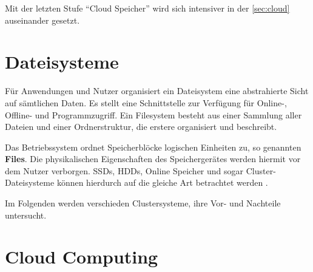 Mit der letzten Stufe ``Cloud Speicher'' wird sich intensiver in der \autoref{sec:cloud} auseinander gesetzt.



\section{Dateisysteme}

Für Anwendungen und Nutzer organisiert ein Dateisystem eine abstrahierte Sicht auf sämtlichen Daten. Es stellt eine Schnittstelle zur Verfügung für Online-, Offline- und Programmzugriff. Ein Filesystem besteht aus einer Sammlung aller Dateien und einer Ordnerstruktur, die erstere organisiert und beschreibt. 

Das Betriebssystem ordnet Speicherblöcke logischen Einheiten zu, so genannten \textbf{Files}. Die physikalischen Eigenschaften des Speichergerätes werden hiermit vor dem Nutzer verborgen. SSDs, HDDs, Online Speicher und sogar Cluster-Dateisysteme können hierdurch auf die gleiche Art betrachtet werden \parencite{silberschatz.2012}.

Im Folgenden werden verschieden Clustersysteme, ihre Vor- und Nachteile untersucht.



\section{Cloud Computing}\label{sec:cloud}
